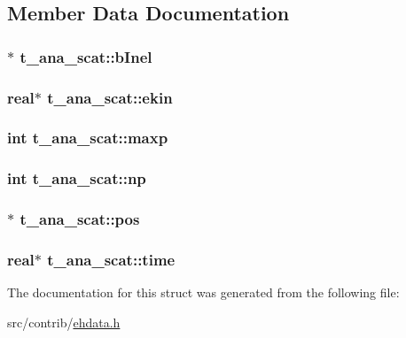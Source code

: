 \subsection{\-Member \-Data \-Documentation}
\hypertarget{structt__ana__scat_a86b752273516b34cbb6f48d3e86cfc8b}{
\subsubsection[{b\-Inel}]{$\ast$ {\bf t\-\_\-ana\-\_\-scat\-::b\-Inel}}}\label{structt__ana__scat_a86b752273516b34cbb6f48d3e86cfc8b}
\hypertarget{structt__ana__scat_a4c0fd6da74c59464ee6269111b94d656}{
\subsubsection[{ekin}]{\setlength{\rightskip}{0pt plus 5cm}real$\ast$ {\bf t\-\_\-ana\-\_\-scat\-::ekin}}}\label{structt__ana__scat_a4c0fd6da74c59464ee6269111b94d656}
\hypertarget{structt__ana__scat_aaf6a7530da89f4247d731333c3dd9be2}{
\subsubsection[{maxp}]{\setlength{\rightskip}{0pt plus 5cm}int {\bf t\-\_\-ana\-\_\-scat\-::maxp}}}\label{structt__ana__scat_aaf6a7530da89f4247d731333c3dd9be2}
\hypertarget{structt__ana__scat_a3fdab3a61c8d70e9bc79ca2fa9c3c282}{
\subsubsection[{np}]{\setlength{\rightskip}{0pt plus 5cm}int {\bf t\-\_\-ana\-\_\-scat\-::np}}}\label{structt__ana__scat_a3fdab3a61c8d70e9bc79ca2fa9c3c282}
\hypertarget{structt__ana__scat_adccd594835225465d79de7306c3ff77c}{
\subsubsection[{pos}]{$\ast$ {\bf t\-\_\-ana\-\_\-scat\-::pos}}}\label{structt__ana__scat_adccd594835225465d79de7306c3ff77c}
\hypertarget{structt__ana__scat_a7795f189590246ad3aec951c3006d17d}{
\subsubsection[{time}]{\setlength{\rightskip}{0pt plus 5cm}real$\ast$ {\bf t\-\_\-ana\-\_\-scat\-::time}}}\label{structt__ana__scat_a7795f189590246ad3aec951c3006d17d}


\-The documentation for this struct was generated from the following file\-:\begin{DoxyCompactItemize}
\item 
src/contrib/\hyperlink{ehdata_8h}{ehdata.\-h}\end{DoxyCompactItemize}
